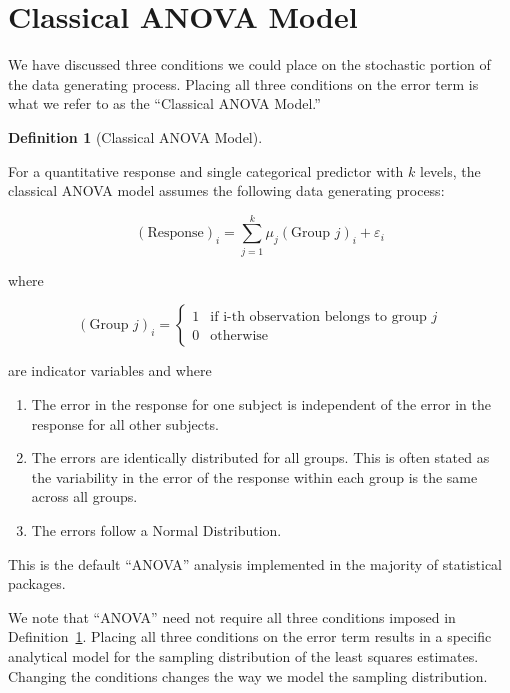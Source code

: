 \documentclass[
  letterpaper,
  DIV=11,
  numbers=noendperiod]{scrreprt}
\providecommand{\tightlist}{%
  \setlength{\itemsep}{0pt}\setlength{\parskip}{0pt}}\usepackage{longtable,booktabs,array}
\theoremstyle{plain}
\theoremstyle{definition}
\theoremstyle{definition}
\newtheorem{definition}{Definition}[chapter]
\theoremstyle{remark}
\begin{document}
\hypertarget{classical-anova-model}{%
\section{Classical ANOVA Model}\label{classical-anova-model}}

We have discussed three conditions we could place on the stochastic
portion of the data generating process. Placing all three conditions on
the error term is what we refer to as the ``Classical ANOVA Model.''

\begin{definition}[Classical ANOVA
Model]\protect\hypertarget{def-classical-anova}{}\label{def-classical-anova}

For a quantitative response and single categorical predictor with \(k\)
levels, the classical ANOVA model assumes the following data generating
process:

\[(\text{Response})_i = \sum_{j=1}^{k} \mu_j (\text{Group } j)_i + \varepsilon_i\]

where

\[
(\text{Group } j)_{i} = \begin{cases}
  1 & \text{if i-th observation belongs to group } j \\
  0 & \text{otherwise}
  \end{cases}
\]

are indicator variables and where

\begin{enumerate}
\def\labelenumi{\arabic{enumi}.}
\tightlist
\item
  The error in the response for one subject is independent of the error
  in the response for all other subjects.
\item
  The errors are identically distributed for all groups. This is often
  stated as the variability in the error of the response within each
  group is the same across all groups.
\item
  The errors follow a Normal Distribution.
\end{enumerate}

This is the default ``ANOVA'' analysis implemented in the majority of
statistical packages.

\end{definition}

We note that ``ANOVA'' need not require all three conditions imposed in
Definition~\ref{def-classical-anova}. Placing all three conditions on
the error term results in a specific analytical model for the sampling
distribution of the least squares estimates. Changing the conditions
changes the way we model the sampling distribution.
\end{document}
